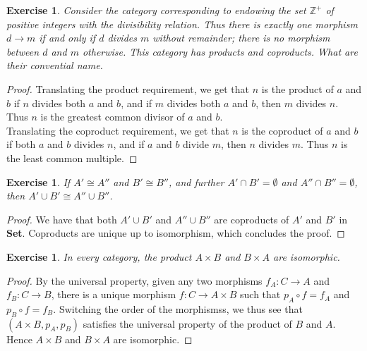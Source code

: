 \documentclass[a4paper, 11pt]{book}
\theoremstyle{plain}
\newtheorem{exercise}[theorem]{Exercise}
\theoremstyle{plain}
\begin{document}
\begin{exercise}
Consider the category corresponding to endowing the set $\mathbb{Z}^+$ of positive integers with the divisibility relation. Thus there is exactly one morphism $d\rightarrow m$ if and only if $d$ divides $m$ without remainder; there is no morphism between $d$ and $m$ otherwise. This category has products and coproducts. What are their convential name.
\end{exercise}
\begin{proof}
Translating the product requirement, we get that $n$ is the product of $a$ and $b$ if $n$ divides both $a$ and $b$, and if $m$ divides both $a$ and $b$, then $m$ divides $n$. Thus $n$ is the greatest common divisor of $a$ and $b$.\\
Translating the coproduct requirement, we get that $n$ is the coproduct of $a$ and $b$ if both $a$ and $b$ divides $n$, and if $a$ and $b$ divide $m$, then $n$ divides $m$. Thus $n$ is the least common multiple.
\end{proof}

\begin{exercise}
If $A'\cong A''$ and $B'\cong B''$, and further $A'\cap B'=\emptyset$ and $A''\cap B''=\emptyset$, then $A'\cup B'\cong A''\cup B''$.
\end{exercise}
\begin{proof}
We have that both $A'\cup B'$ and $A'' \cup B''$ are coproducts of $A'$ and $B'$ in \textbf{Set}. Coproducts are unique up to isomorphism, which concludes the proof.
\end{proof}

\begin{exercise}
In every category, the product $A\times B$ and $B\times A$ are isomorphic.
\end{exercise}
\begin{proof}
By the universal property, given any two morphisms $f_A:C\rightarrow A$ and $f_B:C\rightarrow B$, there is a unique morphism $f:C\rightarrow A\times B$ such that $p_A\circ f = f_A$ and $p_B\circ f = f_B$. Switching the order of the morphismss, we thus see that $(A\times B, p_A, p_B)$ satisfies the universal property of the product of $B$ and $A$. Hence $A\times B$ and $B\times A$ are isomorphic.
\end{proof}
\end{document}
